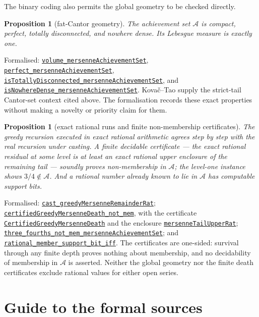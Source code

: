 \documentclass[11pt]{article}
\newcommand{\commit}{81150c1c6fdd4cd51e76d3aa0de344341e0e9e7c}
\newcommand{\repobase}{https://github.com/wcook04/plectis-lean-erdos249-257/blob/\commit}
\newcommand{\PK}{Erdos249257}
\newcommand{\lref}[3]{\href{\repobase/\PK/#1\#L#2}{\nolinkurl{#3}}}
\newcommand{\lrefx}[3]{\href{\repobase/\PK/#1\#L#2}{\nolinkurl{#3}}}
\newtheorem{proposition}[theorem]{Proposition}
\theoremstyle{definition}
\theoremstyle{remark}
\begin{document}
The binary coding also permits the global geometry to be checked directly.

\begin{proposition}[fat-Cantor geometry]\label{res:greedytopology}
The achievement set $\mathcal A$ is compact, perfect, totally disconnected,
and nowhere dense.  Its Lebesgue measure is exactly one.
\end{proposition}
\noindent Formalised:
\lref{GreedyAchievementSet.lean}{996}{volume_mersenneAchievementSet},
\lref{GreedyAchievementSet.lean}{1620}{perfect_mersenneAchievementSet},
\lref{GreedyAchievementSet.lean}{1636}{isTotallyDisconnected_mersenneAchievementSet},
and
\lref{GreedyAchievementSet.lean}{1645}{isNowhereDense_mersenneAchievementSet}.
Kova\v{c}--Tao supply the strict-tail Cantor-set context cited above.  The
formalisation records these exact properties without making a novelty or
priority claim for them.

\begin{proposition}[exact rational runs and finite non-membership certificates]\label{res:death}
The greedy recursion executed in exact rational arithmetic agrees step by step
with the real recursion under casting. A finite decidable certificate --- the
exact rational residual at some level is at least an exact rational upper
enclosure of the remaining tail --- soundly proves non-membership in
$\mathcal A$; the level-one instance shows $3/4\notin\mathcal A$. And a
rational number already known to lie in $\mathcal A$ has computable support
bits.
\end{proposition}
\noindent Formalised:
\lref{GreedyAchievementSet.lean}{1130}{cast_greedyMersenneRemainderRat};
\lref{GreedyAchievementSet.lean}{1726}{certifiedGreedyMersenneDeath_not_mem},
with the certificate
\lrefx{GreedyAchievementSet.lean}{1720}{CertifiedGreedyMersenneDeath} and the
enclosure \lrefx{GreedyAchievementSet.lean}{1687}{mersenneTailUpperRat};
\lref{GreedyAchievementSet.lean}{1748}{three_fourths_not_mem_mersenneAchievementSet};
and \lref{GreedyAchievementSet.lean}{1832}{rational_member_support_bit_iff}.
The certificates are one-sided: survival through any finite depth proves
nothing about membership, and no decidability of membership in $\mathcal A$ is
asserted.  Neither the global geometry nor the finite death certificates
exclude rational values for either open series.

\section{Guide to the formal sources}\label{app:index}
\end{document}
